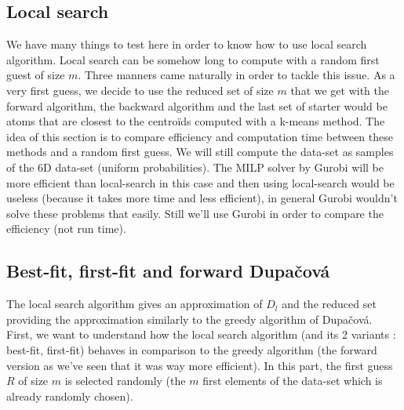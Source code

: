 \documentclass{amsart}
\begin{document}
\subsection{Local search}
We have many things to test here in order to know how to use local search algorithm. Local search can be somehow long to compute with a random first guest of size $m$. Three manners came naturally in order to tackle this issue. As a very first guess, we decide to use the reduced set of size $m$ that we get with the forward algorithm, the backward algorithm and the last set of starter would be atoms that are closest to the centroïds computed with a k-means method. The idea of this section is to compare efficiency and computation time between these methods and a random first guess. We will still compute the data-set as samples of the 6D data-set (uniform probabilities). The MILP solver by Gurobi will be more efficient than local-search in this case and then using local-search would be useless (because it takes more time and less efficient), in general Gurobi wouldn't solve these problems that easily. Still we'll use Gurobi in order to compare the efficiency (not run time).
\subsection{Best-fit, first-fit and forward Dupačová}
The local search algorithm gives an approximation of $D_l$ and the reduced set providing the approximation similarly to the greedy algorithm of Dupačová. First, we want to understand how the local search algorithm (and its 2 variants : best-fit, first-fit) behaves in comparison to the greedy algorithm (the forward version as we've seen that it was way more efficient). In this part, the first guess $R$ of size $m$ is selected randomly (the $m$ first elements of the data-set which is already randomly chosen).
\end{document}
